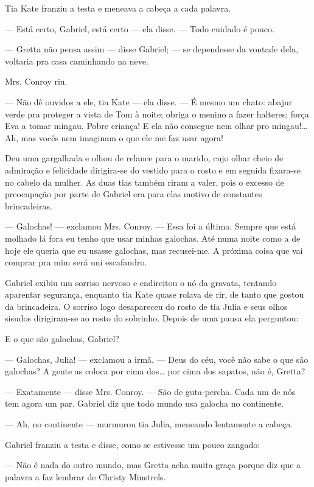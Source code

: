 Tia Kate franziu a testa e meneava a cabeça a cada palavra.

--- Está certo, Gabriel, está certo --- ela disse. --- Todo cuidado
é pouco.

--- Gretta não pensa assim --- disse Gabriel; --- se dependesse da
vontade dela, voltaria pra casa caminhando na neve.

Mrs. Conroy riu.

--- Não dê ouvidos a ele, tia Kate --- ela disse. --- É mesmo um
chato: abajur verde pra proteger a vista de Tom à noite; obriga o
menino a fazer halteres; força Eva a tomar mingau. Pobre criança! E
ela não consegue nem olhar pro mingau!\ldots{} Ah, mas vocês nem imaginam o
que ele me faz usar agora!

Deu uma gargalhada e olhou de relance para o marido, cujo olhar cheio
de admiração e felicidade dirigira-se do vestido para o rosto e em
seguida fixara-se no cabelo da mulher. As duas tias também riram a
valer, pois o excesso de preocupação por parte de Gabriel era para
elas motivo de constantes brincadeiras.

--- Galochas! --- exclamou Mrs. Conroy. --- Essa foi a última. Sempre
que está molhado lá fora eu tenho que usar minhas galochas. Até numa
noite como a de hoje ele queria que eu usasse galochas, mas
recusei-me. A próxima coisa que vai comprar pra mim será uni
escafandro.

Gabriel exibiu um sorriso nervoso e endireitou o nó da gravata,
tentando aparentar segurança, enquanto tia Kate quase rolava de rir,
de tanto que gostou da brincadeira. O sorriso logo desapareceu do
rosto de tia Julia e seus olhos sisudos dirigiram-se ao rosto do
sobrinho. Depois de uma pausa ela perguntou:

E o que são galochas, Gabriel?

--- Galochas, Julia! --- exclamou a irmã. --- Deus do céu, você não
sabe o que são galochas? A gente as coloca por cima dos\ldots{} por cima
dos sapatos, não é, Gretta?

--- Exatamente --- disse Mrs. Conroy. --- São de guta-percha. Cada um
de nós tem agora um par. Gabriel diz que todo mundo usa galocha no
continente.

--- Ah, no continente --- murmurou tia Julia, meneando lentamente a
cabeça.

Gabriel franziu a testa e disse, como se estivesse um pouco zangado:

--- Não é nada do outro mundo, mas Gretta acha muita graça porque diz
que a palavra a faz lembrar de Christy Minstrels.

